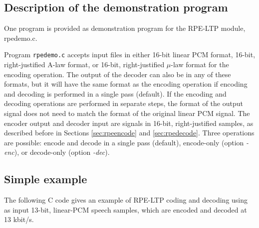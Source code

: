 \subsection {Description of the demonstration program}

One program is provided as demonstration program for the RPE-LTP module,
rpedemo.c.

Program {\tt rpedemo.c} accepts input files in either 16-bit linear
PCM format, 16-bit, right-justified A-law format, or 16-bit,
right-justified $\mu$-law format for the encoding operation. The
output of the decoder can also be in any of these formats, but it will
have the same format as the encoding operation if encoding and
decoding is performed in a single pass (default). If the encoding and
decoding operations are performed in separate steps, the format of the
output signal does not need to match the format of the original linear
PCM signal.  The encoder output and decoder input are signals in
16-bit, right-justified samples, as described before in Sections
\ref{sec:rpeencode} and \ref{sec:rpedecode}. Three operations are
possible: encode and decode in a single pass (default), encode-only
(option {\em -enc}), or decode-only (option {\em -dec}).

\subsection {Simple example}

The following C code gives an example of RPE-LTP coding and decoding
using as input 13-bit, linear-PCM speech samples, which are encoded
and decoded at 13 kbit/s.

